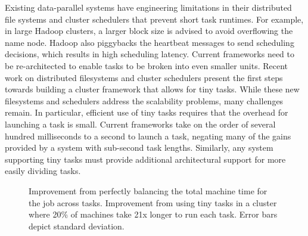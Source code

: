 Existing data-parallel systems have engineering limitations in their distributed
file systems and cluster schedulers that prevent short task runtimes. For example, in
large Hadoop clusters, a larger block size is advised to avoid overflowing the name node.
Hadoop also piggybacks the heartbeat messages to send scheduling decisions, which
results in high scheduling latency.
Current frameworks need to be re-architected to enable tasks to be broken into even smaller
units.
Recent work on distributed filesystems\cite{nightingale2012flat} and cluster
schedulers\cite{ousterhoutbatch} present the first steps towards
building a cluster framework that allows for tiny tasks. While these new filesystems
and schedulers address the scalability problems, many challenges remain. In particular,
efficient use of tiny tasks requires that the overhead for launching a task is small. Current
frameworks take on the order of several hundred milliseconds to a second to launch a task, negating
many of the gains provided by a system with sub-second task lengths. Similarly, any system
supporting tiny tasks must provide additional architectural support for more easily dividing tasks.

\begin{figure}[!ht]
\centering
{}
\hspace{0.2in}
\caption{ Improvement from perfectly balancing the total machine time for the
job across tasks.  Improvement from using tiny tasks in a cluster where 20\% of machines
take 21x longer to run each task. Error bars depict standard deviation.}
\vspace{-0.1in}
\end{figure}

